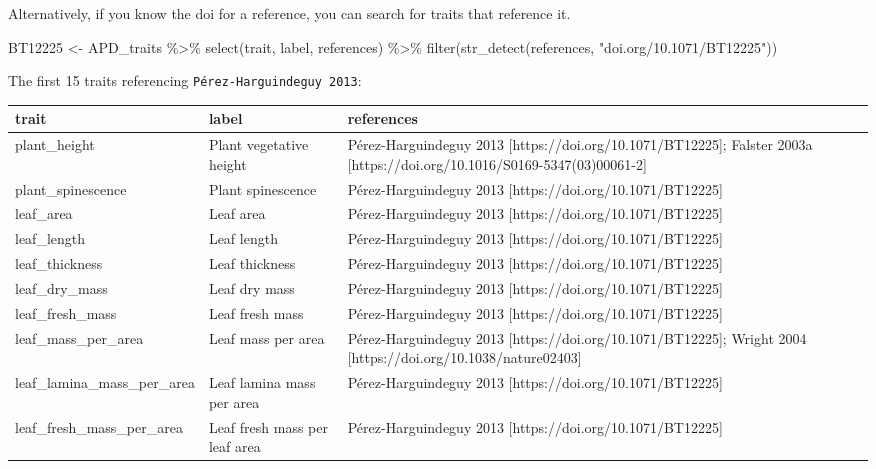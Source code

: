 \documentclass[
  letterpaper,
  DIV=11,
  numbers=noendperiod]{scrartcl}
\newenvironment{Shaded}{\begin{snugshade}}{\end{snugshade}}
\newcommand{\FunctionTok}[1]{\textcolor[rgb]{0.28,0.35,0.67}{#1}}
\newcommand{\NormalTok}[1]{\textcolor[rgb]{0.00,0.23,0.31}{#1}}
\newcommand{\OtherTok}[1]{\textcolor[rgb]{0.00,0.23,0.31}{#1}}
\newcommand{\SpecialCharTok}[1]{\textcolor[rgb]{0.37,0.37,0.37}{#1}}
\newcommand{\StringTok}[1]{\textcolor[rgb]{0.13,0.47,0.30}{#1}}
\begin{document}
Alternatively, if you know the doi for a reference, you can search for
traits that reference it.

\begin{Shaded}
\begin{Highlighting}[]
\NormalTok{BT12225 }\OtherTok{\textless{}{-}} 
\NormalTok{  APD\_traits }\SpecialCharTok{\%\textgreater{}\%}
  \FunctionTok{select}\NormalTok{(trait, label, references) }\SpecialCharTok{\%\textgreater{}\%}
  \FunctionTok{filter}\NormalTok{(}\FunctionTok{str\_detect}\NormalTok{(references, }\StringTok{"doi.org/10.1071/BT12225"}\NormalTok{))}
\end{Highlighting}
\end{Shaded}

The first 15 traits referencing \texttt{Pérez-Harguindeguy\ 2013}:

\begin{tabular}{>{\raggedright\arraybackslash}p{5cm}>{\raggedright\arraybackslash}p{5cm}>{\raggedright\arraybackslash}p{7cm}}
\toprule
trait & label & references\\
\midrule
plant\_height & Plant vegetative height & Pérez-Harguindeguy 2013 [https://doi.org/10.1071/BT12225]; Falster 2003a [https://doi.org/10.1016/S0169-5347(03)00061-2]\\
plant\_spinescence & Plant spinescence & Pérez-Harguindeguy 2013 [https://doi.org/10.1071/BT12225]\\
leaf\_area & Leaf area & Pérez-Harguindeguy 2013 [https://doi.org/10.1071/BT12225]\\
leaf\_length & Leaf length & Pérez-Harguindeguy 2013 [https://doi.org/10.1071/BT12225]\\
leaf\_thickness & Leaf thickness & Pérez-Harguindeguy 2013 [https://doi.org/10.1071/BT12225]\\
\addlinespace
leaf\_dry\_mass & Leaf dry mass & Pérez-Harguindeguy 2013 [https://doi.org/10.1071/BT12225]\\
leaf\_fresh\_mass & Leaf fresh mass & Pérez-Harguindeguy 2013 [https://doi.org/10.1071/BT12225]\\
leaf\_mass\_per\_area & Leaf mass per area & Pérez-Harguindeguy 2013 [https://doi.org/10.1071/BT12225]; Wright 2004 [https://doi.org/10.1038/nature02403]\\
leaf\_lamina\_mass\_per\_area & Leaf lamina mass per area & Pérez-Harguindeguy 2013 [https://doi.org/10.1071/BT12225]\\
leaf\_fresh\_mass\_per\_area & Leaf fresh mass per leaf area & Pérez-Harguindeguy 2013 [https://doi.org/10.1071/BT12225]\\

\end{tabular}
\end{document}

